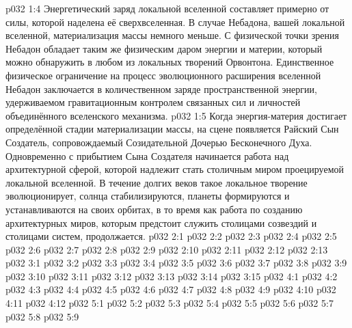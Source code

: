\vs p032 1:4 Энергетический заряд локальной вселенной составляет примерно  от силы, которой наделена её сверхвселенная. В случае Небадона, вашей локальной вселенной, материализация массы немного меньше. С физической точки зрения Небадон обладает таким же физическим даром энергии и материи, который можно обнаружить в любом из локальных творений Орвонтона. Единственное физическое ограничение на процесс эволюционного расширения вселенной Небадон заключается в количественном заряде пространственной энергии, удерживаемом гравитационным контролем связанных сил и личностей объединённого вселенского механизма.
\vs p032 1:5 \pc Когда энергия\hyp{}материя достигает определённой стадии материализации массы, на сцене появляется Райский Сын Создатель, сопровождаемый Созидательной Дочерью Бесконечного Духа. Одновременно с прибытием Сына Создателя начинается работа над архитектурной сферой, которой надлежит стать столичным миром проецируемой локальной вселенной. В течение долгих веков такое локальное творение эволюционирует, солнца стабилизируются, планеты формируются и устанавливаются на своих орбитах, в то время как работа по созданию архитектурных миров, которым предстоит служить столицами созвездий и столицами систем, продолжается.
\vs p032 2:1 
\vs p032 2:2 
\vs p032 2:3 \pc 
\vs p032 2:4 
\vs p032 2:5 
\vs p032 2:6 \pc 
\vs p032 2:7 
\vs p032 2:8 
\vs p032 2:9 \pc 
\vs p032 2:10 
\vs p032 2:11 
\vs p032 2:12 
\vs p032 2:13 \pc 
{}
\vs p032 3:1 
\vs p032 3:2 
\vs p032 3:3 
\vs p032 3:4 \pc 
\vs p032 3:5 
\vs p032 3:6 
\vs p032 3:7 \pc 
\vs p032 3:8 \pc 
\vs p032 3:9 
\vs p032 3:10 
\vs p032 3:11 
\vs p032 3:12 
\vs p032 3:13 
\vs p032 3:14 
\vs p032 3:15 
\vs p032 4:1 
\vs p032 4:2 
\vs p032 4:3 \pc 
\vs p032 4:4 
\vs p032 4:5 \pc 
\vs p032 4:6 \pc 
\vs p032 4:7 
\vs p032 4:8 
\vs p032 4:9 \pc 
\vs p032 4:10 \pc 
\vs p032 4:11 
\vs p032 4:12 
\vs p032 5:1 
\vs p032 5:2 
\vs p032 5:3 \pc 
\vs p032 5:4 
\vs p032 5:5 
\vs p032 5:6 
\vs p032 5:7 \pc 
\vs p032 5:8 
\vsetoff
\vs p032 5:9 
\quizlink
